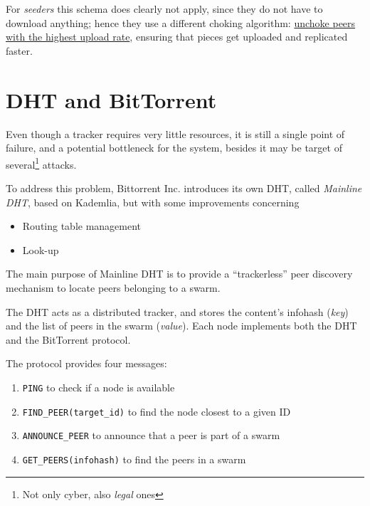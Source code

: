 For \textit{seeders} this schema does clearly not apply, since they do not have to download anything; hence they use a different choking algorithm:
\ul{unchoke peers with the highest upload rate}, ensuring that pieces get uploaded and replicated faster.

\newpage
\section{DHT and BitTorrent}
Even though a tracker requires very little resources, it is still a single point of failure, and a potential bottleneck for the system, besides it may be target of several\footnote{Not only cyber, also \textit{legal} ones} attacks.

To address this problem, Bittorrent Inc. introduces its own DHT, called \textit{Mainline DHT},
based on Kademlia, but with some improvements concerning 
\begin{itemize}
   \item Routing table management
   \item Look-up
\end{itemize}
The main purpose of Mainline DHT is to provide a “trackerless” peer discovery mechanism to locate peers belonging to a swarm.

The DHT acts as a distributed tracker, and stores the content's infohash (\textit{key}) and the list of peers in the swarm (\textit{value}).
Each node implements both the DHT and the BitTorrent protocol.

The protocol provides four messages:
\begin{enumerate}
   \item \texttt{PING} to check if a node is available
   \item \texttt{FIND\_PEER(target\_id)} to find the node closest to a given ID
   \item \texttt{ANNOUNCE\_PEER} to announce that a peer is part of a swarm
   \item \texttt{GET\_PEERS(infohash)} to find the peers in a swarm
\end{enumerate}

